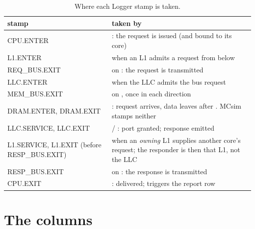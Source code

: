 \begin{table}[htbp]\centering\small
\caption{Where each Logger stamp is taken.}\label{tab:stamps}
\begin{tabularx}{\textwidth}{@{}>{\ttfamily}p{}Y@{}}
\toprule \normalfont stamp & taken by \\ \midrule
CPU.ENTER & : the request is issued (and bound to its core) \\
L1.ENTER &  when an L1 admits a request from below \\
REQ\_BUS.EXIT &  on : the request is transmitted \\
LLC.ENTER &  when the LLC admits the bus request \\
MEM\_BUS.EXIT &  on , once in each direction \\
DRAM.ENTER, DRAM.EXIT & : request arrives, data leaves after . MCsim stamps neither \\
LLC.SERVICE, LLC.EXIT &  / : port granted; response emitted \\
L1.SERVICE, L1.EXIT (before RESP\_BUS.EXIT) &  when an \emph{owning} L1 supplies another core's request; the responder is then that L1, not the LLC \\
RESP\_BUS.EXIT &  on : the response is transmitted \\
CPU.EXIT & : delivered; triggers the report row \\
\bottomrule
\end{tabularx}
\end{table}


\section{The columns}

